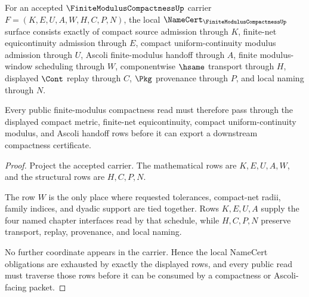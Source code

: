 \begin{theorem}
\label{thm:finite-modulus-compactness-namecert-obligations}
For an accepted $\FiniteModulusCompactnessUp$ carrier $F=(K,E,U,A,W,H,C,P,N)$, the local $\NameCert_{\FiniteModulusCompactnessUp}$ surface consists exactly of compact source admission through $K$, finite-net equicontinuity admission through $E$, compact uniform-continuity modulus admission through $U$, Ascoli finite-modulus handoff through $A$, finite modulus-window scheduling through $W$, componentwise $\hsame$ transport through $H$, displayed $\Cont$ replay through $C$, $\Pkg$ provenance through $P$, and local naming through $N$.

Every public finite-modulus compactness read must therefore pass through the displayed compact metric, finite-net equicontinuity, compact uniform-continuity modulus, and Ascoli handoff rows before it can export a downstream compactness certificate.
\end{theorem}
\begin{proof}
Project the accepted carrier. The mathematical rows are $K,E,U,A,W$, and the structural rows are $H,C,P,N$.

The row $W$ is the only place where requested tolerances, compact-net radii, family indices, and dyadic support are tied together. Rows $K,E,U,A$ supply the four named chapter interfaces read by that schedule, while $H,C,P,N$ preserve transport, replay, provenance, and local naming.

No further coordinate appears in the carrier. Hence the local NameCert obligations are exhausted by exactly the displayed rows, and every public read must traverse those rows before it can be consumed by a compactness or Ascoli-facing packet.
\end{proof}

